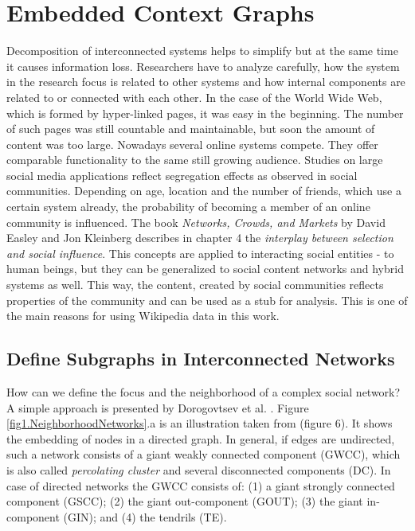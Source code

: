 \documentclass[a4paper,10pt]{scrbook}
\begin{document}
\chapter{Embedded Context Graphs}
\label{chap.DEFINETHESCOPE}
Decomposition of interconnected systems helps to simplify but at the same time it causes information loss. Researchers have to analyze carefully, how the system in the research focus is related to other systems and how internal components are related to or connected with each other. In the case of the World Wide Web, which is formed by hyper-linked pages, it was easy in the beginning. The number of such pages was still countable and maintainable, but soon the amount of content was too large. Nowadays several online systems compete. They offer comparable functionality to the same still growing audience. Studies on large social media applications reflect segregation effects as observed in social communities. Depending on age, location and the number of friends, which use a certain system already, the probability of becoming a member of an online community is influenced. The book \textit{Networks, Crowds, and Markets} by David Easley and Jon Kleinberg \cite{Easley2010} describes in chapter 4 the \textit{interplay between selection and social influence}. This concepts are applied to interacting social entities - to human beings, but they can be generalized to social content networks and hybrid systems as well. This way, the content, created by social communities reflects properties of the community and can be used as a stub for analysis. This is one of the main reasons for using Wikipedia data in this work.

\section{Define Subgraphs in Interconnected Networks}
How can we define the focus and the neighborhood of a complex social network? A simple approach is presented by Dorogovtsev et al. \cite{dorogovtsev2013evolution}.
Figure \ref{fig1.NeighborhoodNetworks}.a is an illustration taken from \cite{dorogovtsev2013evolution} (figure 6). It shows the embedding of nodes in a directed graph. In general, if edges are undirected, such a network consists of a giant weakly connected component (GWCC), which is also called \textit{percolating cluster} and several disconnected components (DC). In case of directed networks the GWCC consists of: (1) a giant strongly connected component (GSCC); (2) the giant out-component (GOUT); (3) the giant in-component (GIN); and (4) the tendrils (TE).
\end{document}
